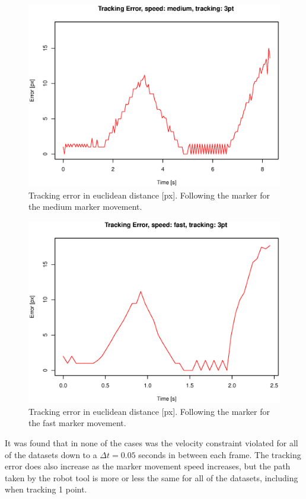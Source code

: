 \begin{figure}[H]
\centering
\includegraphics[width= 0.9 \linewidth]{graphics/robotics/trackingError_medium_3pt}
\caption{Tracking error in euclidean distance [px].
Following the marker for the medium marker movement.}
\label{fig:trackingerror_medium_3p}
\end{figure}

\begin{figure}[H]
\centering
\includegraphics[width= 0.9 \linewidth]{graphics/robotics/trackingError_fast_3pt}
\caption{Tracking error in euclidean distance [px].
Following the marker for the fast marker movement.}
\label{fig:trackingerror_fast_3p}
\end{figure}

It was found that in none of the cases was the velocity constraint violated for all of the datasets down to a $\Delta t = 0.05$ seconds in between each frame.
The tracking error does also increase as the marker movement speed increases, but the path taken by the robot tool is more or less the same for all of the datasets, including when tracking 1 point.
